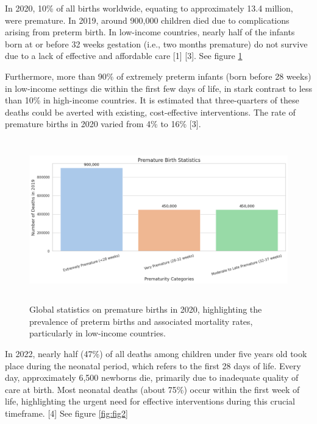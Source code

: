 \documentclass{article}
\begin{document}
In 2020, 10\% of all births worldwide, equating to approximately 13.4
million, were premature. In 2019, around 900,000 children died due to
complications arising from preterm birth. In low-income countries,
nearly half of the infants born at or before 32 weeks gestation (i.e.,
two months premature) do not survive due to a lack of effective and
affordable care {[}1{]} {[}3{]}. See figure \ref{fig:fig1}

Furthermore, more than 90\% of extremely preterm infants (born before 28
weeks) in low-income settings die within the first few days of life, in
stark contrast to less than 10\% in high-income countries. It is
estimated that three-quarters of these deaths could be averted with
existing, cost-effective interventions. The rate of premature births in
2020 varied from 4\% to 16\% {[}3{]}.

\begin{figure}
  \centering
  \includegraphics[width=350pt,height=200pt]{images/clipboard-1098342472.png} %
  \caption{Global statistics on premature births in 2020, highlighting the prevalence of preterm births and associated mortality rates, particularly in low-income countries.}
  \label{fig:fig1}
\end{figure}

In 2022, nearly half (47\%) of all deaths among children under five
years old took place during the neonatal period, which refers to the
first 28 days of life. Every day, approximately 6,500 newborns die,
primarily due to inadequate quality of care at birth. Most neonatal
deaths (about 75\%) occur within the first week of life, highlighting
the urgent need for effective interventions during this crucial
timeframe. {[}4{]} See figure \ref{fig:fig2}
\end{document}
